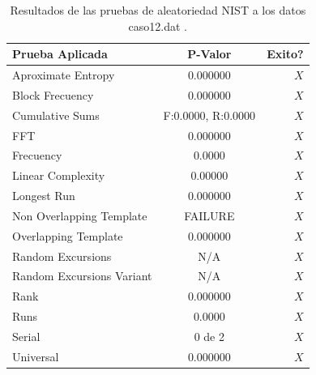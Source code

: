 \documentclass[10pt]{IEEEtran}
\begin{document}
\begin{table}[H]
\caption{Resultados de las pruebas de aleatoriedad NIST a los datos caso12.dat .}
\label{caso7}
\begin{center}
\begin{small}
\begin{tabular}{|l|c|r|}
\hline

Prueba Aplicada &  P-Valor & Exito? \\
\hline

Aproximate Entropy    &     0.000000 & $X$ \\

Block Frecuency  & 0.000000  &  $X$  \\

Cumulative Sums    &   F:0.0000, R:0.0000   & $X$ \\

FFT    &   0.000000 &   $X$      \\

Frecuency     & 0.0000 &  $X$   \\

Linear Complexity      &  0.00000  & $X$  \\

Longest Run      &   0.000000 &   $X$     \\

Non Overlapping Template      & FAILURE    &    $X$          \\

Overlapping Template      &    0.000000   &       $X$        \\

Random Excursions      & N/A  &    $X$      \\

Random Excursions Variant & N/A &     $X$    \\

Rank &  0.000000  &    $X$       \\

Runs &     0.0000  &       $X$      \\

Serial &     0 de 2    &     $X$        \\

Universal &        0.000000  &      $X$             \\

\hline

\end{tabular}
\end{small}
\end{center}
\end{table}
\end{document}
